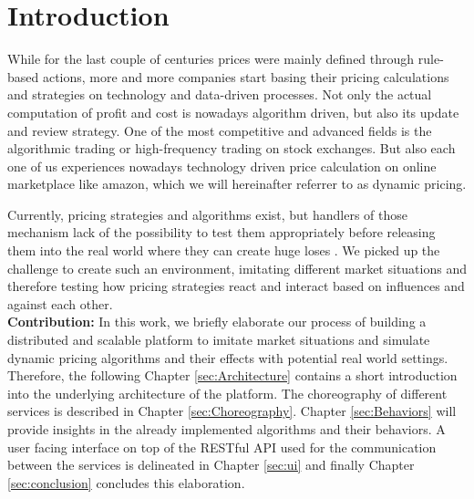 %
\section{Introduction}
\label{sec:Introduction}
%
While for the last couple of centuries prices were mainly defined through rule-based actions, more and more companies start basing their pricing calculations and strategies on technology and data-driven processes. Not only the actual computation of profit and cost is nowadays algorithm driven, but also its update and review strategy.
One of the most competitive and advanced fields is the algorithmic trading or high-frequency trading on stock exchanges. But also each one of us experiences nowadays technology driven price calculation on online marketplace like amazon, which we will hereinafter referrer to as dynamic pricing. 

Currently, pricing strategies and algorithms exist, but handlers of those mechanism lack of the possibility to test them appropriately before releasing them into the real world where they can create huge loses \citep{uflacker2016ertragsmanagement} \citep{schlosser2016optimal} \citep{schlosser2016stochastic} \citep{schlosser2016survive}. We picked up the challenge to create such an environment, imitating different market situations and therefore testing how pricing strategies react and interact based on influences and against each other.\\

\textbf{Contribution:} In this work, we briefly elaborate our process of building a distributed and scalable platform to imitate market situations and simulate dynamic pricing algorithms and their effects with potential real world settings.
Therefore, the following Chapter \ref{sec:Architecture} contains a short introduction into the underlying architecture of the platform.
The choreography of different services is described in Chapter \ref{sec:Choreography}. Chapter \ref{sec:Behaviors} will provide insights in the already implemented algorithms and their behaviors.
A user facing interface on top of the RESTful API used for the communication between the services is delineated in Chapter \ref{sec:ui} and finally Chapter \ref{sec:conclusion} concludes this elaboration. \\

%
%
